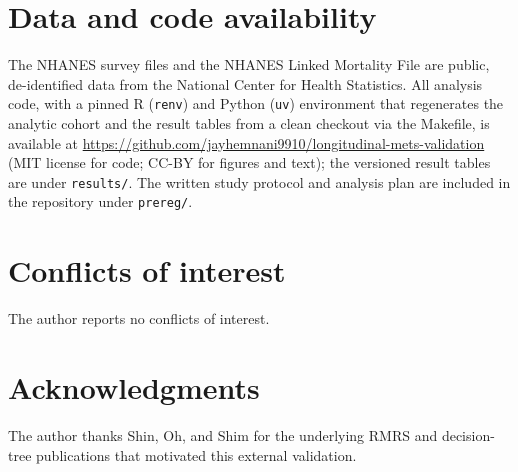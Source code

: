 \documentclass[11pt]{article}
\begin{document}
\section*{Data and code availability}

The NHANES survey files and the NHANES Linked Mortality File are public, de-identified data from the National Center for Health Statistics. All analysis code, with a pinned R (\texttt{renv}) and Python (\texttt{uv}) environment that regenerates the analytic cohort and the result tables from a clean checkout via the Makefile, is available at \url{https://github.com/jayhemnani9910/longitudinal-mets-validation} (MIT license for code; CC-BY for figures and text); the versioned result tables are under \texttt{results/}. The written study protocol and analysis plan are included in the repository under \texttt{prereg/}.

\section*{Conflicts of interest}

The author reports no conflicts of interest.

\section*{Acknowledgments}

The author thanks Shin, Oh, and Shim for the underlying RMRS and decision-tree publications that motivated this external validation.



\end{document}
